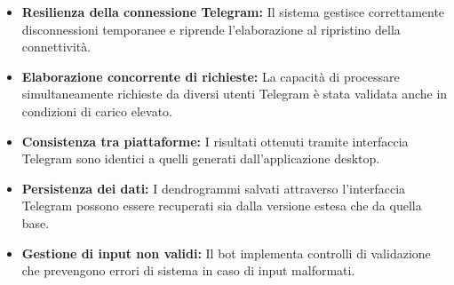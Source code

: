 \begin{itemize}
    \item \textbf{Resilienza della connessione Telegram:} 
    Il sistema gestisce correttamente disconnessioni temporanee e riprende l'elaborazione al ripristino della connettività.
    
    \item \textbf{Elaborazione concorrente di richieste:} 
    La capacità di processare simultaneamente richieste da diversi utenti Telegram è stata validata anche in condizioni di carico elevato.
    
    \item \textbf{Consistenza tra piattaforme:} 
    I risultati ottenuti tramite interfaccia Telegram sono identici a quelli generati dall'applicazione desktop.
    
    \item \textbf{Persistenza dei dati:} 
    I dendrogrammi salvati attraverso l'interfaccia Telegram possono essere recuperati sia dalla versione estesa che da quella base.
    
    \item \textbf{Gestione di input non validi:} 
    Il bot implementa controlli di validazione che prevengono errori di sistema in caso di input malformati.
\end{itemize}